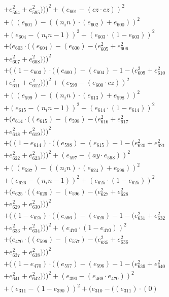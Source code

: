 \documentclass[10pt, a4paper]{article}
\begin{document}
\begin{small}
\begin{align*}
& + e_{594}^{2} + e_{595}^{2})))^{2} + (e_{601} - (cz  \cdot  cz))^{2} \\
& + ((e_{601}) - ((n_in)  \cdot  (e_{602}) + e_{600}))^{2} \\
& + (e_{604} - (n_in - 1))^{2} + (e_{603}  \cdot  (1 - e_{603}))^{2} \\
& + (e_{603}  \cdot  ((e_{604}) - (e_{600}) - (e_{605}^{2} + e_{606}^{2} \\
& + e_{607}^{2} + e_{608}^{2})))^{2} \\
& + ((1 - e_{603})  \cdot  ((e_{600}) - (e_{604}) - 1 - (e_{609}^{2} + e_{610}^{2} \\
& + e_{611}^{2} + e_{612}^{2})))^{2} + (e_{599} - (e_{600}  \cdot  cz))^{2} \\
& + ((e_{599}) - ((n_in)  \cdot  (e_{613}) + e_{598}))^{2} \\
& + (e_{615} - (n_in - 1))^{2} + (e_{614}  \cdot  (1 - e_{614}))^{2} \\
& + (e_{614}  \cdot  ((e_{615}) - (e_{598}) - (e_{616}^{2} + e_{617}^{2} \\
& + e_{618}^{2} + e_{619}^{2})))^{2} \\
& + ((1 - e_{614})  \cdot  ((e_{598}) - (e_{615}) - 1 - (e_{620}^{2} + e_{621}^{2} \\
& + e_{622}^{2} + e_{623}^{2})))^{2} + (e_{597} - (ay  \cdot  e_{598}))^{2} \\
& + ((e_{597}) - ((n_in)  \cdot  (e_{624}) + e_{596}))^{2} \\
& + (e_{626} - (n_in - 1))^{2} + (e_{625}  \cdot  (1 - e_{625}))^{2} \\
& + (e_{625}  \cdot  ((e_{626}) - (e_{596}) - (e_{627}^{2} + e_{628}^{2} \\
& + e_{629}^{2} + e_{630}^{2})))^{2} \\
& + ((1 - e_{625})  \cdot  ((e_{596}) - (e_{626}) - 1 - (e_{631}^{2} + e_{632}^{2} \\
& + e_{633}^{2} + e_{634}^{2})))^{2} + (e_{470}  \cdot  (1 - e_{470}))^{2} \\
& + (e_{470}  \cdot  ((e_{596}) - (e_{557}) - (e_{635}^{2} + e_{636}^{2} \\
& + e_{637}^{2} + e_{638}^{2})))^{2} \\
& + ((1 - e_{470})  \cdot  ((e_{557}) - (e_{596}) - 1 - (e_{639}^{2} + e_{640}^{2} \\
& + e_{641}^{2} + e_{642}^{2})))^{2} + (e_{390} - (e_{469}  \cdot  e_{470}))^{2} \\
& + (e_{311} - (1 - e_{390}))^{2} + (e_{310} - ((e_{311})  \cdot  (0) \\

\end{align*}
\end{small}
\end{document}
